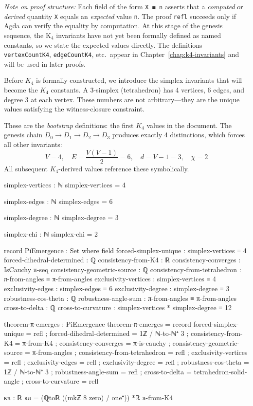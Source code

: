 \documentclass[11pt,a4paper]{book}
\begin{document}
\medskip
\noindent\textit{Note on proof structure:} Each field of the form \texttt{X ≡ n} asserts that 
a \emph{computed} or \emph{derived} quantity \texttt{X} equals an \emph{expected} value \texttt{n}.
The proof \texttt{refl} succeeds only if Agda can verify the equality by computation.
At this stage of the genesis sequence, the K$_4$ invariants have not yet been formally defined 
as named constants, so we state the expected values directly. The definitions 
\texttt{vertexCountK4}, \texttt{edgeCountK4}, etc.\ appear in Chapter~\ref{chap:k4-invariants} 
and will be used in later proofs.

Before $K_4$ is formally constructed, we introduce the simplex invariants that will 
become the $K_4$ constants. A 3-simplex (tetrahedron) has 4 vertices, 6 edges, and 
degree 3 at each vertex. These numbers are not arbitrary---they are the unique values 
satisfying the witness-closure constraint.

These are the \emph{bootstrap} definitions: the first $K_4$ values in the document.
The genesis chain $D_0 \to D_1 \to D_2 \to D_3$ produces exactly 4 distinctions,
which forces all other invariants:
\[
V = 4, \quad E = \frac{V(V-1)}{2} = 6, \quad d = V-1 = 3, \quad \chi = 2
\]
All subsequent $K_4$-derived values reference these symbolically.

\begin{code}
simplex-vertices : ℕ
simplex-vertices = 4

simplex-edges : ℕ
simplex-edges = 6

simplex-degree : ℕ
simplex-degree = 3

simplex-chi : ℕ
simplex-chi = 2

record PiEmergence : Set where
  field
    forced-simplex-unique      : simplex-vertices ≡ 4
    forced-dihedral-determined : ℚ
    consistency-from-K4        : ℝ
    consistency-converges      : IsCauchy π-seq
    consistency-geometric-source : ℚ
    consistency-from-tetrahedron : π-from-angles ≡ π-from-angles
    exclusivity-vertices : simplex-vertices ≡ 4
    exclusivity-edges    : simplex-edges ≡ 6
    exclusivity-degree   : simplex-degree ≡ 3
    robustness-cos-theta : ℚ
    robustness-angle-sum : π-from-angles ≡ π-from-angles
    cross-to-delta       : ℚ
    cross-to-curvature   : simplex-vertices * simplex-degree ≡ 12

theorem-π-emerges : PiEmergence
theorem-π-emerges = record
  { forced-simplex-unique = refl
  ; forced-dihedral-determined = 1ℤ / ℕ-to-ℕ⁺ 3
  ; consistency-from-K4 = π-from-K4
  ; consistency-converges = π-is-cauchy
  ; consistency-geometric-source = π-from-angles
  ; consistency-from-tetrahedron = refl
  ; exclusivity-vertices = refl
  ; exclusivity-edges = refl
  ; exclusivity-degree = refl
  ; robustness-cos-theta = 1ℤ / ℕ-to-ℕ⁺ 3
  ; robustness-angle-sum = refl
  ; cross-to-delta = tetrahedron-solid-angle
  ; cross-to-curvature = refl
  }

κπ : ℝ
κπ = (ℚtoℝ ((mkℤ 8 zero) / one⁺)) *ℝ π-from-K4
\end{code}
\end{document}
